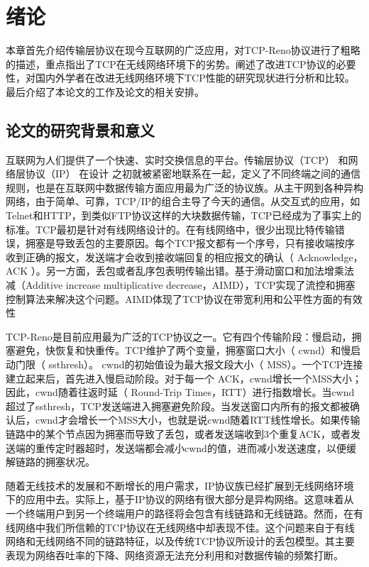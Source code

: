 
\chapter{绪论}
\par
本章首先介绍传输层协议在现今互联网的广泛应用，对TCP-Reno协议进行了粗略的描述，重点指出了TCP在无线网络环境下的劣势。阐述了改进TCP协议的必要性，对国内外学者在改进无线网络环境下TCP性能的研究现状进行分析和比较。最后介绍了本论文的工作及论文的相关安排。
\section{论文的研究背景和意义}
\par
互联网为人们提供了一个快速、实时交换信息的平台。传输层协议（TCP） 和网络层协议（IP） 在设计
之初就被紧密地联系在一起，定义了不同终端之间的通信规则，也是在互联网中数据传输方面应用最为广泛的协议族。从主干网到各种异构网络，由于简单、可靠，TCP/IP的组合主导了今天的通信。从交互式的应用，如Telnet和HTTP，到类似FTP协议这样的大块数据传输，TCP已经成为了事实上的标准。TCP最初是针对有线网络设计的。在有线网络中，很少出现比特传输错误，拥塞是导致丢包的主要原因。每个TCP报文都有一个序号，只有接收端按序收到正确的报文，发送端才会收到接收端回复的相应报文的确认（ Acknowledge，ACK ）。另一方面，丢包或者乱序包表明传输出错。基于滑动窗口和加法增乘法减（Additive  increase multiplicative decrease，AIMD）\cite{Chiu1989Analysis}，TCP实现了流控和拥塞控制算法来解决这个问题。AIMD体现了TCP协议在带宽利用和公平性方面的有效性
\par
TCP-Reno是目前应用最为广泛的TCP协议之一。它有四个传输阶段：慢启动，拥塞避免，快恢复和快重传。TCP维护了两个变量，拥塞窗口大小（ cwnd）和慢启动门限（ ssthresh）。 cwnd的初始值设为最大报文段大小（ MSS）。一个TCP连接建立起来后，首先进入慢启动阶段。对于每一个
ACK，cwnd增长一个MSS大小；因此，cwnd随着往返时延（ Round-Trip Times，RTT）进行指数增长。当cwnd超过了ssthresh，TCP发送端进入拥塞避免阶段。当发送窗口内所有的报文都被确认后，cwnd才会增长一个MSS大小，也就是说cwnd随着RTT线性增长。如果传输链路中的某个节点因为拥塞而导致了丢包，或者发送端收到3个重复ACK，或者发送端的重传定时器超时，发送端都会减小cwnd的值，进而减小发送速度，以便缓解链路的拥塞状况。

\par
随着无线技术的发展和不断增长的用户需求，IP协议族已经扩展到无线网络环境下的应用中去。实际上，基于IP协议的网络有很大部分是异构网络。这意味着从一个终端用户到另一个终端用户的路径将会包含有线链路和无线链路。然而，在有线网络中我们所信赖的TCP协议在无线网络中却表现不佳。这个问题来自于有线网络和无线网络不同的链路特征，以及传统TCP协议所设计的丢包模型。其主要表现为网络吞吐率的下降、网络资源无法充分利用和对数据传输的频繁打断。

